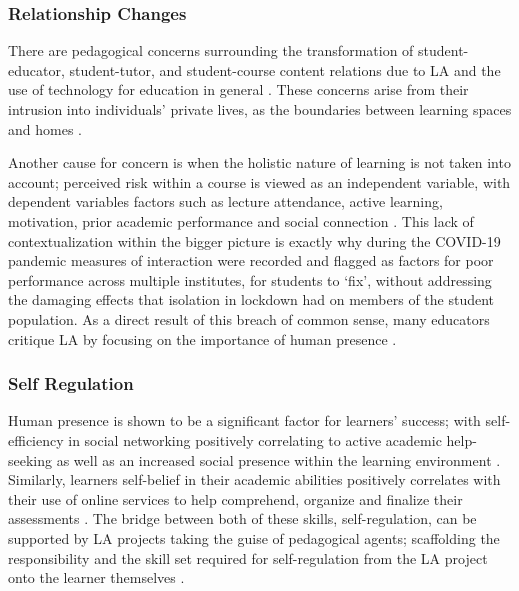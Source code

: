 \documentclass{l4proj}
\begin{document}
\subsubsection{Relationship Changes}
\hfill

There are pedagogical concerns surrounding the transformation of student-educator, student-tutor, and student-course content relations due to LA and the use of technology for education in general \citep{Yen-TingLiuLearningPoint, Tempelaar2017AcceptedAssessment, Agudo-Peregrina2014CanLearning}. These concerns arise from their intrusion into individuals' private lives, as the boundaries between learning spaces and homes \citep{Baek2023Educational2019}. 

Another cause for concern is when the holistic nature of learning is not taken into account; perceived risk within a course is viewed as an independent variable, with dependent variables factors such as lecture attendance, active learning, motivation, prior academic performance and social connection \citep{Ifenthaler2020UtilisingReview}. This lack of contextualization within the bigger picture is exactly why during the COVID-19 pandemic measures of interaction were recorded and flagged as factors for poor performance across multiple institutes, for students to ‘fix’, without addressing the damaging effects that isolation in lockdown had on members of the student population. As a direct result of this breach of common sense, many educators critique LA by focusing on the importance of human presence \citep{MerikkoTechnologicalProcess}.

\subsubsection{Self Regulation}
\hfill

Human presence is shown to be a significant factor for learners' success; with self-efficiency in social networking positively correlating to active academic help-seeking as well as an increased social presence within the learning environment \citep{Keshavarzi2023MediatingEnvironments}. Similarly, learners self-belief in their academic abilities positively correlates with their use of online services to help comprehend, organize and finalize their assessments \citep{Keshavarzi2023MediatingEnvironments}. The bridge between both of these skills, self-regulation, can be supported by LA projects taking the guise of pedagogical agents; scaffolding the responsibility and the skill set required for self-regulation from the LA project onto the learner themselves \citep{MerikkoTechnologicalProcess}. 
\end{document}
